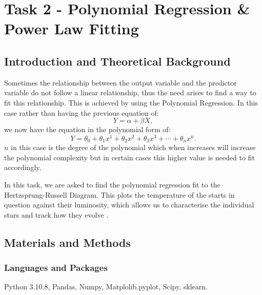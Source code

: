 \documentclass[12pt, a4paper]{article}
\begin{document}
\section{Task 2 -  Polynomial Regression \& Power Law Fitting}

\subsection{Introduction and Theoretical Background}
Sometimes the relationship between the output variable and the predictor variable do not follow a linear relationship, thus the need arises to find a way to fit this relationship. This is achieved by using the Polynomial Regression. In this case rather than having the previous equation of:
\begin{equation}
    Y = \alpha + \beta X ,
\end{equation}
we now have the equation in the polynomial form of:
\begin{equation}
    Y = \theta_0 + \theta_1 x^1+ \theta_2 x^2 + \theta_3 x^3 + \cdots + \theta_n x^n .
\end{equation}
\(n\) in this case is the degree of the polynomial which when increases will increase the polynomial complexity but in certain cases this higher value is needed to fit accordingly.

In this task, we are asked to find the polynomial regression fit to the Hertzsprung-Russell Diagram. This plots the temperature of the starts in question against their luminosity, which allows us to characterise the individual stars and track how they evolve \parencite{muncaster}.

\subsection{Materials and Methods}
\subsubsection{Languages and Packages}
Python 3.10.8, Pandas, Numpy, Matplolib.pyplot, Scipy, sklearn.
\end{document}
